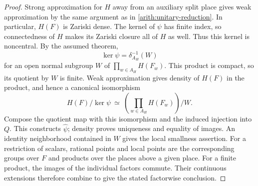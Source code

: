 \begin{proof}
Strong approximation for $H$ away from an auxiliary split place gives
weak approximation by the same argument as in
\cref{arith:unitary-reduction}.  In particular, $H(F)$ is Zariski dense.
The kernel of $\psi$ has finite index, so connectedness of $H$ makes
its Zariski closure all of $H$ as well.  Thus this kernel is noncentral.  By the assumed theorem,
\[
 \ker\psi=\delta_{A_H}^{-1}(W)
\]
for an open normal subgroup $W$ of
$\prod_{w\in A_H}H(F_w)$.  This product is compact, so its quotient by
$W$ is finite.  Weak approximation gives density of $H(F)$ in the
product, and hence a canonical isomorphism
\[
 H(F)/\ker\psi\ \simeq\
 \left(\prod_{w\in A_H}H(F_w)\right)/W.
\]
Compose the quotient map with this isomorphism and the induced injection
into $Q$.  This constructs $\widehat\psi$; density proves uniqueness and
equality of images.  An identity neighborhood contained in $W$ gives
the local smallness assertion.
For a restriction of scalars, rational points and local points are the
corresponding groups over $F$ and products over the places above a given
place.  For a finite product, the images of the individual factors
commute.  Their continuous extensions therefore combine to give the
stated factorwise conclusion.
\end{proof}
